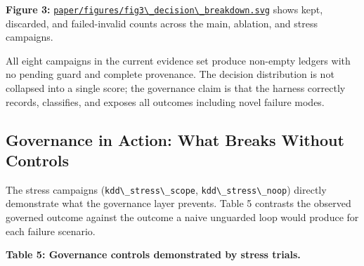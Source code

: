 \textbf{Figure 3:} \href{../../figures/fig3_decision_breakdown.svg}{\passthrough{\lstinline!paper/figures/fig3\_decision\_breakdown.svg!}} shows kept, discarded, and failed-invalid counts across the main, ablation, and stress campaigns.

All eight campaigns in the current evidence set produce non-empty ledgers with no pending guard and complete provenance. The decision distribution is not collapsed into a single score; the governance claim is that the harness correctly records, classifies, and exposes all outcomes including novel failure modes.

\subsection{Governance in Action: What Breaks Without Controls}\label{governance-in-action-what-breaks-without-controls}

The stress campaigns (\passthrough{\lstinline!kdd\_stress\_scope!}, \passthrough{\lstinline!kdd\_stress\_noop!}) directly demonstrate what the governance layer prevents. Table 5 contrasts the observed governed outcome against the outcome a naive unguarded loop would produce for each failure scenario.

\textbf{Table 5: Governance controls demonstrated by stress trials.}

